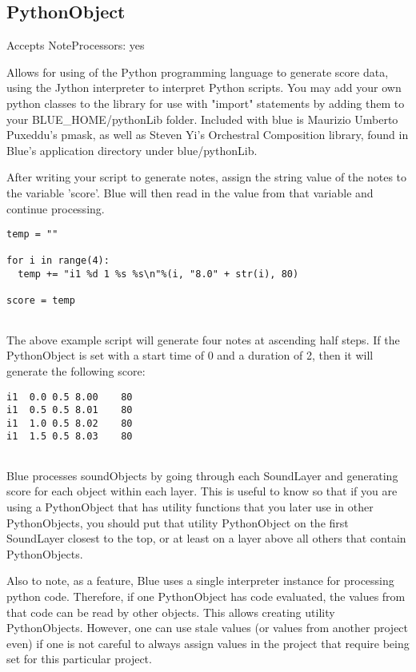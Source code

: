 \subsection{PythonObject}\label{pythonObject}

Accepts NoteProcessors: yes

Allows for using of the Python programming language to generate score
data, using the Jython interpreter to interpret Python scripts. You may
add your own python classes to the library for use with "import"
statements by adding them to your BLUE\_HOME/pythonLib folder. Included
with blue is Maurizio Umberto Puxeddu's pmask, as well as Steven Yi's
Orchestral Composition library, found in Blue's application directory
under blue/pythonLib.

After writing your script to generate notes, assign the string value of
the notes to the variable 'score'. Blue will then read in the value from
that variable and continue processing.

\begin{verbatim}
temp = ""

for i in range(4):
  temp += "i1 %d 1 %s %s\n"%(i, "8.0" + str(i), 80)

score = temp
    
\end{verbatim}

The above example script will generate four notes at ascending half
steps. If the PythonObject is set with a start time of 0 and a duration
of 2, then it will generate the following score:

\begin{verbatim}
i1  0.0 0.5 8.00    80
i1  0.5 0.5 8.01    80
i1  1.0 0.5 8.02    80
i1  1.5 0.5 8.03    80
    
\end{verbatim}

Blue processes soundObjects by going through each SoundLayer and
generating score for each object within each layer. This is useful to
know so that if you are using a PythonObject that has utility functions
that you later use in other PythonObjects, you should put that utility
PythonObject on the first SoundLayer closest to the top, or at least on
a layer above all others that contain PythonObjects.

Also to note, as a feature, Blue uses a single interpreter instance for
processing python code. Therefore, if one PythonObject has code
evaluated, the values from that code can be read by other objects. This
allows creating utility PythonObjects. However, one can use stale values
(or values from another project even) if one is not careful to always
assign values in the project that require being set for this particular
project.

